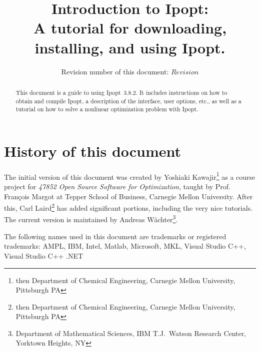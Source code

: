 \documentclass[10pt]{article}
\newcommand{\Ipopt}{{\sc Ipopt}}
\begin{document}
\title{Introduction to \Ipopt:\\
A tutorial for downloading, installing, and using \Ipopt.}

\author{Revision number of this document: $Revision$}

\maketitle

\begin{abstract}
  This document is a guide to using \Ipopt\ 3.8.2.  It includes
  instructions on how to obtain and compile \Ipopt, a description of
  the interface, user options, etc., as well as a tutorial on how to
  solve a nonlinear optimization problem with \Ipopt.
\end{abstract}

\section*{History of this document}
The initial version of this document was created by Yoshiaki
Kawajir\footnote{then Department of Chemical Engineering, Carnegie Mellon
  University, Pittsburgh PA} as a course project for \textit{47852
  Open Source Software for Optimization}, taught by Prof. Fran\c cois
Margot at Tepper School of Business, Carnegie Mellon University.
After this, Carl Laird\footnote{then Department of Chemical
  Engineering, Carnegie Mellon University, Pittsburgh PA} has added
significant portions, including the very nice tutorials.  The current
version is maintained by Andreas W\"achter\footnote{Department of
  Mathematical Sciences, IBM T.J.\ Watson Research Center, Yorktown
  Heights, NY}.

\tableofcontents

\vspace{\baselineskip}
\begin{small}
\noindent
The following names used in this document are trademarks or registered
trademarks: AMPL, IBM, Intel, Matlab, Microsoft, MKL, Visual Studio C++,
Visual Studio C++ .NET
\end{small}
\end{document}
